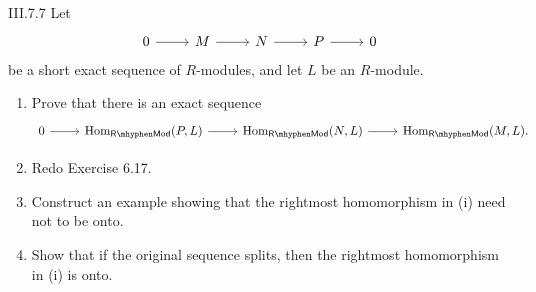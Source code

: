 \begin{problem}{III.7.7}
Let
\[
\begin{tikzcd}
0 \arrow[r] &M \arrow[r] &N \arrow[r] &P \arrow[r] &0
\end{tikzcd}
\]
be a short exact sequence of $R$-modules, and let $L$ be an $R$-module.
\begin{enumerate}[label=(\roman*)]
    \setlength\itemsep{0pt}
    \item Prove that there is an exact sequence 
    \[
    \begin{tikzcd}
    0 \arrow[r] &\Hom_\mathsf{R\mhyphen Mod}(P,L) \arrow[r] &\Hom_\mathsf{R\mhyphen Mod}(N,L) \arrow[r] &\Hom_\mathsf{R\mhyphen Mod}(M,L).
    \end{tikzcd}
    \]
    \item Redo Exercise 6.17.
    \item Construct an example showing that the rightmost homomorphism in (i) need not to be onto.
    \item Show that if the original sequence splits, then the rightmost homomorphism in (i) is onto.
\end{enumerate}
\end{problem}

